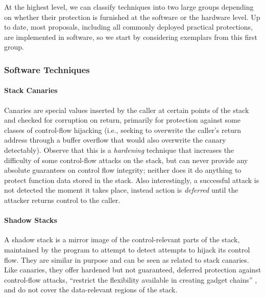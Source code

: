 At the highest level, we can classify techniques into two large groups depending
on whether their protection is furnished at the software or the hardware level.
Up to date, most proposals, including all commonly deployed practical
protections, are implemented in software, so we start by considering exemplars
from this first group.

\subsubsection{Software Techniques}

\paragraph{Stack Canaries}
%
Canaries are special values inserted by the caller at certain points of the
stack and checked for corruption on return, primarily for protection against
some classes of control-flow hijacking (i.e., seeking to overwrite the caller's
return address through a buffer overflow that would also overwrite the canary
detectably).
%
Observe that this is a \emph{hardening} technique that increases the difficulty
of some control-flow attacks on the stack, but can never provide any absolute
guarantees on control flow integrity; neither does it do anything to protect
function data stored in the stack.
%
Also interestingly, a successful attack is not detected the moment it takes
place, instead action is \emph{deferred} until the attacker returns control to
the caller.

\paragraph{Shadow Stacks}
%
A shadow stack is a mirror image of the control-relevant parts of the stack,
maintained by the program to attempt to detect attempts to hijack its control
flow. They are similar in purpose and can be seen as related to stack canaries.
Like canaries, they offer hardened but not guaranteed, deferred protection
against control-flow attacks, ``restrict the flexibility available in creating
gadget chains'' \cite{Shanbhogue+19}, and do not cover the data-relevant regions
of the stack.
%

